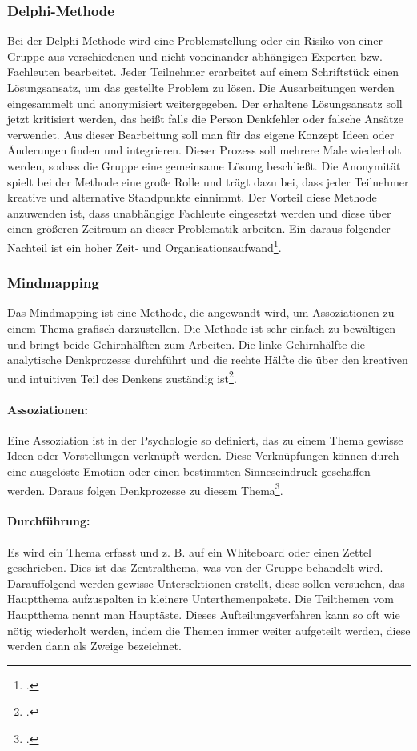\subsubsection{Delphi-Methode}
Bei der Delphi-Methode wird eine Problemstellung oder ein Risiko von einer Gruppe aus verschiedenen und nicht voneinander abhängigen Experten bzw. Fachleuten bearbeitet. 
Jeder Teilnehmer erarbeitet auf einem Schriftstück einen Lösungsansatz, um das gestellte Problem zu lösen.
Die Ausarbeitungen werden eingesammelt und anonymisiert weitergegeben.
Der erhaltene Lösungsansatz soll jetzt kritisiert werden, das heißt falls die Person Denkfehler oder falsche Ansätze verwendet. Aus dieser Bearbeitung soll man für das eigene Konzept Ideen oder Änderungen finden und integrieren.
Dieser Prozess soll mehrere Male wiederholt werden, sodass die Gruppe eine gemeinsame Lösung beschließt.
Die Anonymität spielt bei der Methode eine große Rolle und trägt dazu bei, dass jeder Teilnehmer kreative und alternative Standpunkte einnimmt.
Der Vorteil diese Methode anzuwenden ist, dass unabhängige Fachleute eingesetzt werden und diese über einen größeren Zeitraum an dieser Problematik arbeiten.
Ein daraus folgender Nachteil ist ein hoher Zeit- und Organisationsaufwand\footcite{risikomanagement-diplomarbeit-methoden}.

\subsubsection{Mindmapping}
Das Mindmapping ist eine Methode, die angewandt wird, um Assoziationen zu einem Thema grafisch darzustellen.
Die Methode ist sehr einfach zu bewältigen und bringt beide Gehirnhälften zum Arbeiten. Die linke Gehirnhälfte die analytische Denkprozesse durchführt und die rechte Hälfte die über den kreativen und intuitiven Teil des Denkens zuständig ist\footcite{risikomanagement-diplomarbeit-methoden}.

\paragraph{Assoziationen:} 
Eine Assoziation ist in der Psychologie so definiert, das zu einem Thema gewisse Ideen oder Vorstellungen verknüpft werden. Diese Verknüpfungen können durch eine ausgelöste Emotion oder einen bestimmten Sinneseindruck geschaffen werden. Daraus folgen Denkprozesse zu diesem Thema\footcite{assoziationen}. 

\paragraph{Durchführung:}
Es wird ein Thema erfasst und z. B. auf ein Whiteboard oder einen Zettel geschrieben. Dies ist das Zentralthema, was von der Gruppe behandelt wird.
Darauffolgend werden gewisse Untersektionen erstellt, diese sollen versuchen, das Hauptthema aufzuspalten in kleinere Unterthemenpakete.
Die Teilthemen vom Hauptthema nennt man Hauptäste.
Dieses Aufteilungsverfahren kann so oft wie nötig wiederholt werden, indem die Themen immer weiter aufgeteilt werden, diese werden dann als Zweige bezeichnet.

